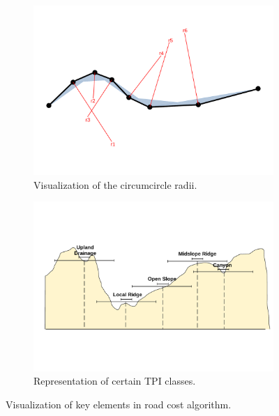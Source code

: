             \begin{figure}[ht]
            \centering
            \begin{subfigure}[b]{0.9\textwidth}
                \centering
                \includegraphics[trim={0cm 3.55cm 0cm 2.8cm}, clip, width=\textwidth]{images/path_curvature.pdf}
                \caption{Visualization of the circumcircle radii.}
                \label{fig:curvature}
            \end{subfigure}
            \begin{subfigure}[b]{0.9\textwidth}
                \centering
                \includegraphics[trim={0cm 5.2cm 0cm 5.2cm}, clip, width=\textwidth]{images/TPI_classification.pdf}
                \caption{Representation of certain TPI classes.}
                \label{fig:TPI}
            \end{subfigure}
            \caption{Visualization of key elements in road cost algorithm.}
        \end{figure}

